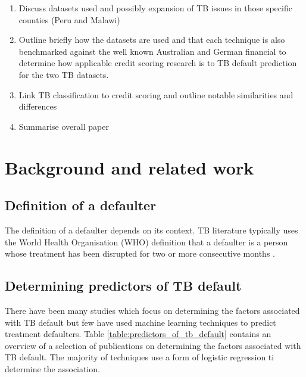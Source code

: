 \documentclass{sig-alternate-05-2015}
\begin{document}
	\begin{enumerate}
		\item Discuss datasets used and possibly expansion of TB issues in those specific counties (Peru and Malawi)
		\item Outline briefly how the datasets are used and that each technique is also benchmarked against the well known Australian and German financial to determine how applicable credit scoring research is to TB default prediction for the two TB datasets.
		\item Link TB classification to credit scoring and outline notable similarities and differences
		\item Summarise overall paper
	\end{enumerate}
	
	\section{Background and related work}
	\subsection{Definition of a defaulter}
	The definition of a defaulter depends on its context. TB literature typically uses the World Health Organisation (WHO) definition that a defaulter is a person whose treatment has been disrupted for two or more consecutive months \cite{chan:2003prevalence, cherkaoui:19326203, Jha:10.1371/journal.pone.0008873,jittimanee:10.1111/j.1440-172X.2007.00650.x,muture:6660173120110101, world2015TB}.
	
	\subsection{Determining predictors of TB default}
	There have been many studies which focus on determining the factors associated with TB default but few have used machine learning techniques to predict treatment defaulters. Table \ref{table:predictors_of_tb_default} contains an overview of a selection of publications on determining the factors associated with TB default. The majority of techniques use a form of logistic regression ti determine the association. 
	
\end{document}
